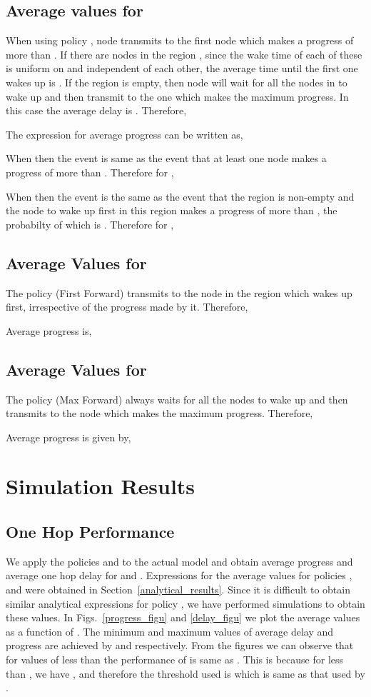 \documentclass[onecolumn]{IEEEtran}
\begin{document}
\subsection{Average values for }
When using policy , node  transmits to the first node which makes a progress of more than . If there are  nodes in the  region , since the wake time of each of these is uniform on  and independent of each other, the average time until the first one wakes up is . If the region    is empty, then node  will wait for all the nodes in  to wake up and then transmit to the one which makes the maximum progress. In this case the average delay is . Therefore,
 
The expression for average progress can be written as,

When  then  the event  is same as the event that at least one node makes a progress of more than . 
Therefore for ,

When  then the event  is the same as the event that the region  is non-empty and the node to wake up first in this region makes a progress of more than , the probabilty of which is .
Therefore for ,

\subsection{Average Values for }
The policy  (First Forward) transmits to the node in the region  which wakes up first, irrespective of the progress made by it. Therefore,

Average progress is,

\subsection{Average Values for }
The policy  (Max Forward) always waits for all the nodes to wake up and then transmits to the node which makes the maximum progress. Therefore,

Average progress is given by, 

\section{Simulation Results}
\label{simulation_results}
\subsection{One Hop Performance}
We apply the policies  and  to the
actual model and obtain average progress and average one hop delay for
 and . Expressions for the average values for policies
,  and  were obtained in Section~\ref{analytical_results}.
 Since it is
difficult to obtain similar analytical expressions for policy
, we have performed simulations to obtain these
values.  In Figs.~\ref{progress_figu} and \ref{delay_figu} we plot
the average values as a function of .  The minimum and maximum
values of average delay and progress are achieved by  and
 respectively. From the figures we can observe that for
values of  less than  the
performance of  is same as . This is because
for  less than , we have , and therefore
the threshold used is  which is same as that used by
.
\end{document}
